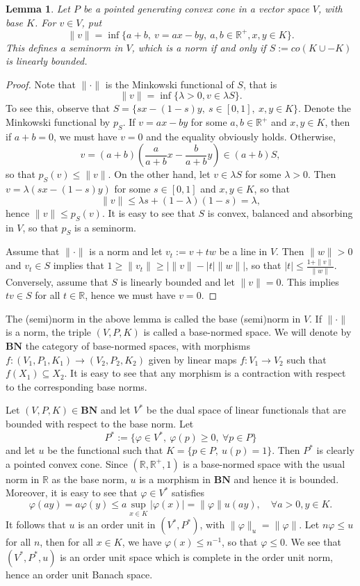 \documentclass[12pt]{article}
\newtheorem{lemma}{Lemma}
\newcommand{\<}{\langle}
\newcommand{\ct}[1]{\mathbf{#1}}
\begin{document}
\begin{lemma} Let $P$ be a pointed generating convex cone in a vector space $V$, with base $K$. For $v\in V$, put 
\[
\|v\|=\inf\{a+b,\ v=a x-b y,\ a,b\in \mathbb R^+, x,y\in K\}.
\]
This defines a seminorm in $V$, which is a norm if and only if $S:=co(K\cup -K)$ is linearly bounded. 

\end{lemma}

\begin{proof} Note that $\|\cdot\|$ is the Minkowski functional of $S$, that is
\[
\|v\|= \inf\{\lambda>0, v\in \lambda S\}.
\]
To see this, observe that $S=\{s x-(1-s)y,\ s\in [0,1],\ x,y\in K\}$. Denote the Minkowski functional by $p_S$. If $v=ax-by$ for some $a,b\in \mathbb R^+$ and $x,y\in K$, then if $a+b=0$, we must have 
$v=0$ and the equality obviously holds. Otherwise, 
\[
v=(a+b)(\frac a{a+b} x-\frac b{a+b} y)\in (a+b) S,
\]
so that $p_S(v)\le \|v\|$. On the other hand, let $v\in \lambda S$ for some $\lambda>0$. Then $v=\lambda(sx-(1-s)y)$ for some $s\in [0,1]$ and $x,y\in K$, so that 
\[
\|v\|\le \lambda s+(1-\lambda)(1-s)=\lambda,
\]
hence $\|v\|\le p_S(v)$. It is easy to see that $S$ is convex, balanced and absorbing in $V$, so that $p_S$ is a seminorm.  

Assume that $\|\cdot\|$ is a norm and let $v_t:=v+tw$ be a line in $V$. Then $\|w\|>0$ and $v_t\in  S$ implies that $1\ge \|v_t\|\ge |\|v\|-|t|\|w\||$, so that $|t|\le \tfrac{1+\|v\|}{\|w\|}$. Conversely, assume that $S$ is linearly bounded and let $\|v\|=0$. This implies $tv\in S$ for all $t\in \mathbb R$, hence we must have $v=0$. 

\end{proof}

The (semi)norm in the above lemma is called  the base (semi)norm in $V$. If $\|\cdot\|$ is a norm, the triple $(V,P,K)$ is called a base-normed space. We will denote 
by $\ct{BN}$ the category of base-normed spaces, with morphisms $f: (V_1,P_1,K_1)\to (V_2,P_2,K_2)$ given by linear maps $f:V_1\to V_2$ such that $f(X_1)\subseteq X_2$. It is easy to see that any morphism is a contraction with respect to the corresponding base norms.

Let $(V,P,K)\in \ct{BN}$ and let $V^*$ be the dual space of linear functionals that are bounded with respect to the base norm. Let 
\[
P^*:=\{ \varphi\in V^*,\ \varphi(p)\ge 0,\ \forall p\in P\}
\]
and let $u$ be the functional such that $K=\{p\in P,\ u(p)=1\}$. Then $P^*$ is clearly a pointed convex cone.
Since $(\mathbb R, \mathbb R^+, 1)$ is a base-normed space with the usual norm in $\mathbb R$ as the base norm, $u$ is a morphism in $\ct{BN}$ and hence it is bounded. Moreover, it is easy to see that  $\varphi\in V^*$ satisfies
\[
\varphi(ay)=a\varphi(y)\le a\sup_{x\in K}|\varphi(x)|=\|\varphi\|u(ay),\quad \forall  a>0, y\in K.
\]
It follows that $u$ is an order unit in $(V^*,P^*)$, with $\|\varphi\|_u=\|\varphi\|$. Let $n\varphi\le u$ for all $n$, then for all $x\in K$, we have $\varphi(x)\le n^{-1}$, so that $\varphi\le 0$. We see that $(V^*,P^*,u)$ is an order unit space which is complete in the order unit norm, hence an order unit Banach space.
\end{document}
